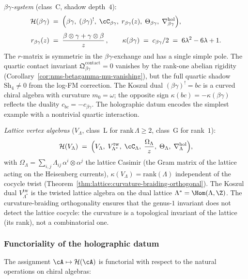 \medskip\noindent
\emph{$\beta\gamma$-system} (class~C, shadow depth~$4$):
\begin{align*}
\mathcal H(\beta\gamma)
&\;=\;
\Bigl(
\beta\gamma,\;
(\beta\gamma)^!,\;
\cC_{\beta\gamma},\;
r_{\beta\gamma}(z),\;
\Theta_{\beta\gamma},\;
\nabla^{\mathrm{hol}}_{\beta\gamma}
\Bigr),\\[4pt]
r_{\beta\gamma}(z)
&\;=\;
\frac{\beta\otimes\gamma+\gamma\otimes\beta}{z}\,,
\qquad
\kappa(\beta\gamma)\;=\;c_{\beta\gamma}/2\;=\;6\lambda^2-6\lambda+1.
\end{align*}
The $r$-matrix is symmetric in the $\beta\gamma$-exchange and
has a single simple pole. The quartic contact invariant
$\mathfrak Q^{\mathrm{contact}}_{\beta\gamma}=0$ vanishes by
the rank-one abelian rigidity
(Corollary~\ref{cor:nms-betagamma-mu-vanishing}), but the full
quartic shadow $\mathrm{Sh}_4\neq 0$ from the log-FM correction.
The Koszul dual $(\beta\gamma)^! = bc$ is a curved chiral algebra
with curvature $m_0=\omega$; the opposite sign $\kappa(bc) = -\kappa(\beta\gamma)$
reflects the duality $c_{bc} = -c_{\beta\gamma}$.
The holographic datum encodes the simplest example with a
nontrivial quartic interaction.

\medskip\noindent
\emph{Lattice vertex algebras} ($V_\Lambda$, class~L for
$\mathrm{rank}\,\Lambda\ge 2$, class~G for rank~$1$):
\[
\mathcal H(V_\Lambda)
\;=\;
\Bigl(
V_\Lambda,\;V_{\Lambda^*}^{\mathrm{tw}},\;
\cC_\Lambda,\;\frac{\Omega_\Lambda}{z},\;
\Theta_\Lambda,\;\nabla^{\mathrm{hol}}_\Lambda
\Bigr),
\]
with $\Omega_\Lambda=\sum_{i,j}\Lambda_{ij}\,\alpha^i
\otimes\alpha^j$ the lattice Casimir (the Gram matrix of the
lattice acting on the Heisenberg currents),
$\kappa(V_\Lambda)=\mathrm{rank}(\Lambda)$ independent of the
cocycle twist (Theorem~\ref{thm:lattice:curvature-braiding-orthogonal}).
The Koszul dual $V_{\Lambda^*}^{\mathrm{tw}}$ is the twisted
lattice algebra on the dual lattice $\Lambda^*=\Hom(\Lambda,\Z)$.
The curvature-braiding orthogonality ensures that the genus-$1$
invariant does not detect the lattice cocycle: the curvature
is a topological invariant of the lattice (its rank), not a
combinatorial one.

\subsubsection*{Functoriality of the holographic datum}

The assignment $\cA\mapsto\mathcal H(\cA)$ is functorial with
respect to the natural operations on chiral algebras:


